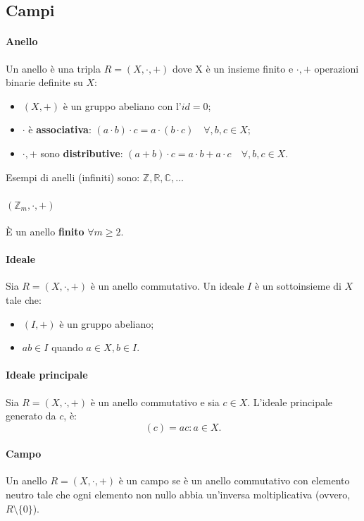 \subsection{Campi}

\paragraph{\textbf{Anello}} Un anello è una tripla $R=(X, \cdot, +)$ dove X è un insieme finito e $\cdot, +$ operazioni binarie definite su $X$:
\begin{itemize}
    \item $(X, +)$ è un gruppo abeliano con l'$id=0$;
    \item $\cdot$ è \textbf{associativa}: $(a \cdot b) \cdot c= a \cdot( b \cdot c) \quad \forall,b,c \in X$;
    \item $\cdot, +$ sono \textbf{distributive}: $(a+b) \cdot c = a \cdot b + a \cdot c \quad \forall,b,c \in X$. 
\end{itemize}

Esempi di anelli (infiniti) sono: $\mathbb{Z}, \mathbb{R}, \mathbb{C}, \dots$

\paragraph{$(\mathbb{Z}_m, \cdot, +)$} È un anello \textbf{finito} $\forall m \geq 2$.  

\paragraph{\textbf{Ideale}} Sia $R=(X, \cdot, +)$ è un anello commutativo. Un ideale $I$ è un sottoinsieme di $X$ tale che:
\begin{itemize}
    \item $(I, +)$ è un gruppo abeliano;
    \item $ab \in I$ quando $a \in X, b \in I$.
\end{itemize}

\paragraph{\textbf{Ideale principale}} Sia $R=(X, \cdot, +)$ è un anello commutativo e sia $c \in X$. L'ideale principale generato da $c$, è: 
\[
    (c)={ac: a \in X}. 
\]

\paragraph{\textbf{Campo}} Un anello $R=(X, \cdot, +)$ è un campo se è un anello commutativo con elemento neutro tale che ogni elemento non nullo abbia un'inversa moltiplicativa (ovvero, $R \setminus \{0\}$). 

